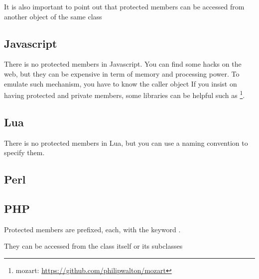\documentclass{KodeBook}
\begin{document}
It is also important to point out that protected members can be accessed from another object of the same class 



\subsection{Javascript} 

There is no protected members in Javascript. 
You can find some hacks on the web, but they can be expensive in term of memory and processing power.
To emulate such mechanism, you have to know the caller object 
If you insist on having protected and private members, some libraries can be helpful such as \footnote{mozart: \url{https://github.com/philipwalton/mozart}}.


\subsection{Lua}

There is no protected members in Lua, but you can use a naming convention to specify them.

\subsection{Perl}

%

\subsection{PHP}

Protected members are prefixed, each, with the keyword .



They can be accessed from the class itself or its subclasses


\end{document}
